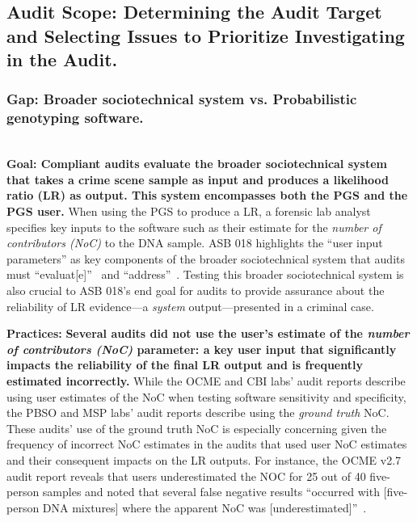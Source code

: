 \subsection{Audit Scope: Determining the Audit Target and Selecting Issues to Prioritize Investigating in the Audit.}
\label{sec:scope}
\subsubsection{Gap: Broader sociotechnical system vs. Probabilistic genotyping software.}
\label{sec:scope-gap1-target}

\textbf{\\Goal: Compliant audits evaluate the broader sociotechnical system that takes a crime scene sample as input and produces a likelihood ratio (LR) as output. This system encompasses both the PGS and the PGS user.} When using the PGS to produce a LR, a forensic lab analyst specifies key inputs to the software such as their estimate for the \textit{number of contributors (NoC)} to the DNA sample. ASB 018 highlights the ``user input parameters'' as key components of the broader sociotechnical system that audits must ``evaluat[e]''~\cite[R4.1.4]{asb018} and ``address''~\cite[Annex R4.1.4]{asb018}. Testing this broader sociotechnical system is also crucial to ASB 018's end goal for audits to provide assurance about the reliability of LR evidence---a \textit{system} output---presented in a criminal case.


\textbf{Practices:} \textbf{Several audits did not use the user's estimate of the \textit{number of contributors (NoC)} parameter: a key user input that significantly impacts the reliability of the final LR output and is frequently estimated incorrectly.} While the OCME and CBI labs' audit reports describe using user estimates of the NoC when testing software sensitivity and specificity, the PBSO and MSP labs' audit reports describe using the \textit{ground truth} NoC. These audits' use of the ground truth NoC is especially concerning given the frequency of incorrect NoC estimates in the audits that used user NoC estimates and their consequent impacts on the LR outputs. For instance, the OCME v2.7 audit report reveals that users underestimated the NOC for 25 out of 40 five-person samples and noted that several false negative results ``occurred with [five-person DNA mixtures] where the apparent NoC was [underestimated]''~\cite[p.21]{ocmeIV2.7}. 

